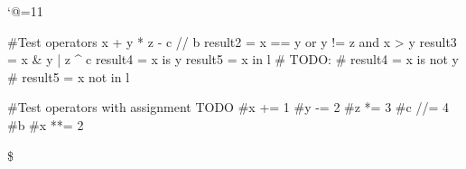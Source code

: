\let\e\expandafter
\catcode`@=11








\def\@pytexChar@Backslash{\loggingall\@pytexParser@parse}
\let\@pytexChar@Dollar\bye

%

\@pytexCatcodes@setallactive

#Test operators
x + y * z - c // b %
result2 = x == y or y != z and x > y
result3 = x & y | z ^ c
result4 = x is y
result5 = x in l
# TODO:
# result4 = x is not y
# result5 = x not in l

#Test operators with assignment TODO
#x += 1
#y -= 2
#z *= 3
#c //= 4
#b %
#x **= 2

\$
\bye
